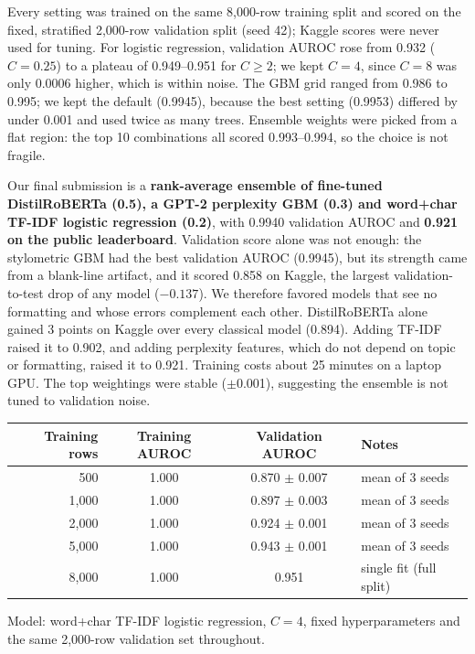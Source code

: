 Every setting was trained on the same 8,000-row training split and scored on the
fixed, stratified 2,000-row validation split (seed 42); Kaggle scores were never
used for tuning. For logistic regression, validation AUROC rose from 0.932
($C=0.25$) to a plateau of 0.949--0.951 for $C \ge 2$; we kept $C=4$, since
$C=8$ was only 0.0006 higher, which is within noise. The GBM grid ranged from
0.986 to 0.995; we kept the default (0.9945), because the best setting (0.9953)
differed by under 0.001 and used twice as many trees. Ensemble weights were
picked from a flat region: the top 10 combinations all scored 0.993--0.994, so
the choice is not fragile.

Our final submission is a \textbf{rank-average ensemble of fine-tuned
DistilRoBERTa (0.5), a GPT-2 perplexity GBM (0.3) and word+char TF-IDF logistic
regression (0.2)}, with 0.9940 validation AUROC and \textbf{0.921 on the public
leaderboard}. Validation score alone was not enough: the stylometric GBM had the
best validation AUROC (0.9945), but its strength came from a blank-line artifact,
and it scored 0.858 on Kaggle, the largest validation-to-test drop of any model
($-0.137$). We therefore favored models that see no formatting and whose errors
complement each other. DistilRoBERTa alone gained 3 points on Kaggle over every
classical model (0.894). Adding TF-IDF raised it to 0.902, and adding perplexity
features, which do not depend on topic or formatting, raised it to 0.921.
Training costs about 25 minutes on a laptop GPU. The top weightings were stable
($\pm$0.001), suggesting the ensemble is not tuned to validation noise.

\begin{center}
\begin{tabular}{|r|c|c|l|}
\hline
\textbf{Training rows} & \textbf{Training AUROC} & \textbf{Validation AUROC} & \textbf{Notes} \\
\hline
500   & 1.000 & 0.870 $\pm$ 0.007 & mean of 3 seeds \\
1,000 & 1.000 & 0.897 $\pm$ 0.003 & mean of 3 seeds \\
2,000 & 1.000 & 0.924 $\pm$ 0.001 & mean of 3 seeds \\
5,000 & 1.000 & 0.943 $\pm$ 0.001 & mean of 3 seeds \\
8,000 & 1.000 & 0.951 & single fit (full split) \\
\hline
\end{tabular}
\end{center}
{\footnotesize Model: word+char TF-IDF logistic regression, $C=4$, fixed
hyperparameters and the same 2,000-row validation set throughout.}

